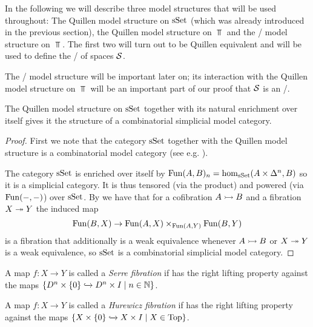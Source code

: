 In the following we will describe three model structures that will be used throughout:
The Quillen model structure on $\operatorname{sSet}$ (which was already introduced in the previous section), the Quillen model structure on $\Top$ and the \Strom/ model structure on $\Top$.
The first two will turn out to be Quillen equivalent and will be used to define the \inftycat/ of spaces $\mathcal{S}$.

The \Strom/ model structure will be important later on; its interaction with the Quillen model structure on $\Top$ will be an important part of our proof that $\mathcal{S}$ is an \inftytop/.
\begin{prop}\label{prop:sSetCombSimpModelStructure}
    The Quillen model structure on $\operatorname{sSet}$ together with its natural enrichment over itself gives it the structure of a combinatorial simplicial model category.
    \begin{proof}
        First we note that the category $\operatorname{sSet}$ together with the Quillen model structure is a combinatorial model category (see e.g. \cite[Remark 7.11.15]{cisinski_2019}).
        
        The category $\operatorname{sSet}$ is enriched over itself by $\operatorname{Fun}(A,B)_n=\hom_{\operatorname{sSet}}(A\times\Delta^n,B)$ so it is a simplicial category.
        It is thus tensored (via the product) and powered (via $\operatorname{Fun}(-,-)$) over $\operatorname{sSet}$.
        By \cite[Corollary 1.4.5.6, Theorem 3.1.3.1 and Theorem 3.1.3.5]{kerodon} we have that for a cofibration $A\xtailrightarrow{} B$ and a fibration $X\xtwoheadrightarrow{} Y$ the induced map 
        \begin{equation*}
            \operatorname{Fun}(B,X)\to\operatorname{Fun}(A,X)\times_{\operatorname{Fun}(A,Y)}\operatorname{Fun}(B,Y)
        \end{equation*}
        is a fibration that additionally is a weak equivalence whenever $A\xtailrightarrow{} B$ or $X\xtwoheadrightarrow{} Y$ is a weak equivalence, so $\operatorname{sSet}$ is a combinatorial simplicial model category.
    \end{proof}
\end{prop}
\begin{definition}
    A map $f\colon X\to Y$ is called a \emph{Serre fibration} if has the right lifting property against the maps $\left\lbrace D^n\times\left\lbrace0\right\rbrace\xhookrightarrow{}D^n\times I\mid n\in\mathbb{N}\right\rbrace$.
\end{definition}
\begin{definition}
    A map $f\colon X\to Y$ is called a \emph{Hurewicz fibration} if has the right lifting property against the maps $\left\lbrace X\times\left\lbrace0\right\rbrace\xhookrightarrow{}X\times I\mid X\in\operatorname{Top}\right\rbrace$.
\end{definition}
